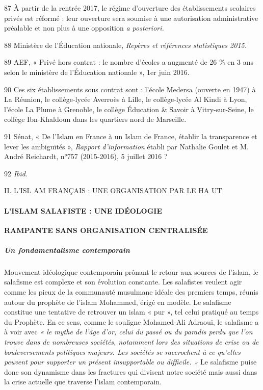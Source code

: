 87 À partir de la rentrée 2017, le régime d'ouverture des établissements
scolaires privés est réformé : leur ouverture sera soumise à une
autorisation administrative préalable et non plus à une opposition
\emph{a posteriori.}

88 Ministère de l'Éducation nationale, \emph{Repères et références
statistiques 2015.}

89 AEF, « Privé hors contrat : le nombre d'écoles a augmenté de 26 \% en
3 ans selon le ministère de l'Éducation nationale », 1er juin 2016.

90 Ces six établissements sous contrat sont : l'école Medersa (ouverte
en 1947) à La Réunion, le collège-lycée Averroès à Lille, le
collège-lycée Al Kindi à Lyon, l'école La Plume à Grenoble, le collège
Éducation \& Savoir à Vitry-sur-Seine, le collège Ibn-Khaldoun dans les
quartiers nord de Marseille.



91 Sénat, « De l'Islam en France à un Islam de France, établir la
transparence et lever les ambiguïtés », \emph{Rapport d'information}
établi par Nathalie Goulet et M. André Reichardt, n°757 (2015-2016), 5
juillet 2016 ?

92 \emph{Ibid.}

II. L'ISL AM FRANÇAIS : UNE ORGANISATION PAR LE HA UT


\hypertarget{lislam-salafiste-une-iduxe9ologie}{%
\paragraph{L'ISLAM SALAFISTE : UNE
IDÉOLOGIE}\label{lislam-salafiste-une-iduxe9ologie}}


\textbf{RAMPANTE SANS ORGANISATION CENTRALISÉE}


\hypertarget{un-fondamentalisme-contemporain}{%
\subparagraph{Un fondamentalisme
contemporain}\label{un-fondamentalisme-contemporain}}


Mouvement idéologique contemporain prônant le retour aux sources de
l'islam, le salafisme est complexe et son évolution constante. Les
salafistes veulent agir comme les pieux de la communauté musulmane
idéale des premiers temps, réunis autour du prophète de l'islam
Mohammed, érigé en modèle. Le salafisme constitue une tentative de
retrouver un islam « pur », tel celui pratiqué au temps du Prophète. En
ce sens, comme le souligne Mohamed-Ali Adraoui, le salafisme a à voir
avec \emph{« le mythe de l'âge d'or, celui du passé ou du paradis perdu
que l'on trouve dans de nombreuses sociétés, notamment lors des
situations de crise ou de bouleversements politiques majeurs. Les
sociétés se raccrochent à ce qu'elles peuvent pour supporter un présent
insupportable ou difficile. »} Le salafisme puise donc son dynamisme
dans les fractures qui divisent notre société mais aussi dans la crise
actuelle que traverse l'islam contemporain.

